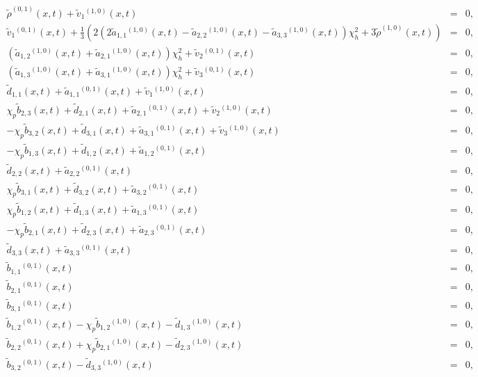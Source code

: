 \documentclass[
10pt, %
a4paper, %
oneside, %
headinclude,footinclude, %
table
]{scrartcl}
\begin{document}
$$
\begin{array}{rcl}
\tilde{\rho}^{(0,1)}(x,t)+\tilde{v}_1{}^{(1,0)}(x,t)	&=&0,\\
%
\tilde{v}_1{}^{(0,1)}(x,t)+\frac{1}{3} \left(2 \left(2\tilde{a}_{1,1}{}^{(1,0)}(x,t)-\tilde{a}_{2,2}{}^{(1,0)}(x,t)-\tilde{a}_{3,3}{}^{(1,0)}(x,t)\right) \chi _h^2+3 \tilde{\rho}^{(1,0)}(x,t)\right)&=&0,\\
%
   \left(\tilde{a}_{1,2}{}^{(1,0)}(x,t)+\tilde{a}_{2,1}{}^{(1,0)}(x,t)\right) \chi_h^2+\tilde{v}_2{}^{(0,1)}(x,t)&=&0,\\
%
   \left(\tilde{a}_{1,3}{}^{(1,0)}(x,t)+\tilde{a}_{3,1}{}^{(1,0)}(x,t)\right) \chi_h^2+\tilde{v}_3{}^{(0,1)}(x,t)&=&0,\\
%
   \tilde{d}_{1,1}(x,t)+\tilde{a}_{1,1}{}^{(0,1)}(x,t)+\tilde{v}_1{}^{(1,0)}(x,t)&=&0,\\
%
   \chi _p \tilde{b}_{2,3}(x,t)+\tilde{d}_{2,1}(x,t)+\tilde{a}_{2,1}{}^{(0,1)}(x,t)+\tilde{v}_2{}^{(1,0)}(x,t)&=&0,\\
%
  -\chi _p \tilde{b}_{3,2}(x,t)+\tilde{d}_{3,1}(x,t)+\tilde{a}_{3,1}{}^{(0,1)}(x,t)+\tilde{v}_3{}^{(1,0)}(x,t)&=&0,\\
%
   -\chi _p \tilde{b}_{1,3}(x,t)+\tilde{d}_{1,2}(x,t)+\tilde{a}_{1,2}{}^{(0,1)}(x,t)&=&0,\\
%
   \tilde{d}_{2,2}(x,t)+\tilde{a}_{2,2}{}^{(0,1)}(x,t)&=&0,\\
%
   \chi _p \tilde{b}_{3,1}(x,t)+\tilde{d}_{3,2}(x,t)+\tilde{a}_{3,2}{}^{(0,1)}(x,t)&=&0,\\
%
   \chi _p \tilde{b}_{1,2}(x,t)+\tilde{d}_{1,3}(x,t)+\tilde{a}_{1,3}{}^{(0,1)}(x,t)&=&0,\\
%
   -\chi _p \tilde{b}_{2,1}(x,t)+\tilde{d}_{2,3}(x,t)+\tilde{a}_{2,3}{}^{(0,1)}(x,t)&=&0,\\
%
   \tilde{d}_{3,3}(x,t)+\tilde{a}_{3,3}{}^{(0,1)}(x,t)&=&0,\\
%
   \tilde{b}_{1,1}{}^{(0,1)}(x,t)&=&0,\\
%
   \tilde{b}_{2,1}{}^{(0,1)}(x,t)&=&0,\\
%
   \tilde{b}_{3,1}{}^{(0,1)}(x,t)&=&0,\\
%   
   \tilde{b}_{1,2}{}^{(0,1)}(x,t)-\chi _p \tilde{b}_{1,2}{}^{(1,0)}(x,t)-\tilde{d}_{1,3}{}^{(1,0)}(x,t)&=&0,\\
%
   \tilde{b}_{2,2}{}^{(0,1)}(x,t)+\chi _p \tilde{b}_{2,1}{}^{(1,0)}(x,t)-\tilde{d}_{2,3}{}^{(1,0)}(x,t)&=&0,\\
%
   \tilde{b}_{3,2}{}^{(0,1)}(x,t)-\tilde{d}_{3,3}{}^{(1,0)}(x,t)&=&0,\\

\end{array}$$
\end{document}

